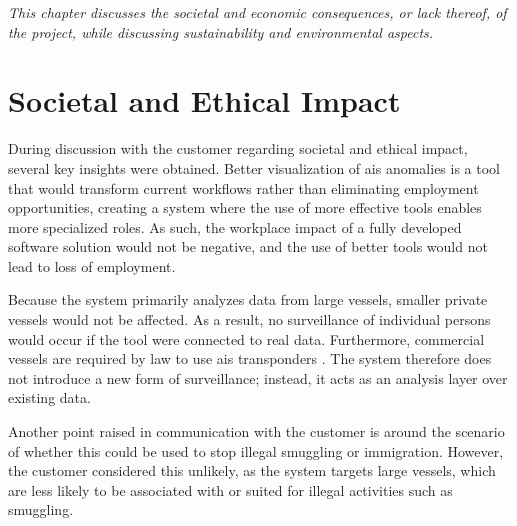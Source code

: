 \textit{This chapter discusses the societal and economic consequences, or lack thereof, of the project, while discussing sustainability and environmental aspects.}

\section{Societal and Ethical Impact}


During discussion with the customer regarding societal and ethical impact, several key insights were obtained. Better visualization of \acrshort{ais} anomalies is a tool that would transform current workflows rather than eliminating employment opportunities, creating a system where the use of more effective tools enables more specialized roles. As such, the workplace impact of a fully developed software solution would not be negative, and the use of better tools would not lead to loss of employment.

Because the system primarily analyzes data from large vessels, smaller private vessels would not be affected. As a result, no surveillance of individual persons would occur if the tool were connected to real data. Furthermore, commercial vessels are required by law to use \acrshort{ais} transponders \parencite{kystverket_ais_norge}. The system therefore does not introduce a new form of surveillance; instead, it acts as an analysis layer over existing data.

Another point raised in communication with the customer is around the scenario of whether this could be used to stop illegal smuggling or immigration. However, the customer considered this unlikely, as the system targets large vessels, which are less likely to be associated with or suited for illegal activities such as smuggling.

